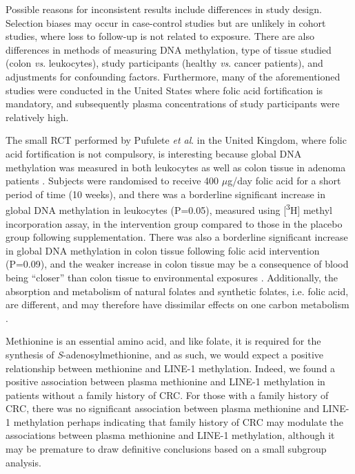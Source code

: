 \noindent Possible reasons for inconsistent results include differences in study design. Selection biases may occur in case-control studies but are unlikely in cohort studies, where loss to follow-up is not related to exposure. There are also differences in methods of measuring DNA methylation, type of tissue studied (colon \emph{vs}. leukocytes), study participants (healthy \emph{vs}. cancer patients), and adjustments for confounding factors. Furthermore, many of the aforementioned studies were conducted in the United States where folic acid fortification is mandatory, and subsequently plasma concentrations of study participants were relatively high.

\noindent The small RCT performed by Pufulete \emph{et al}. in the United Kingdom, where folic acid fortification is not compulsory, is interesting because global DNA methylation was measured in both leukocytes as well as colon tissue in adenoma patients \cite{c552}. Subjects were randomised to receive 400 $\mu$g/day folic acid for a short period of time (10 weeks), and there was a borderline significant increase in global DNA methylation in leukocytes (P=0.05), measured using [\textsuperscript{3}H] methyl incorporation assay, in the intervention group compared to those in the placebo group following supplementation. There was also a borderline significant increase in global DNA methylation in colon tissue following folic acid intervention (P=0.09), and the weaker increase in colon tissue may be a consequence of blood being ``closer'' than colon tissue to environmental exposures \cite{c553}. Additionally, the absorption and metabolism of natural folates and synthetic folates, i.e. folic acid, are different, and may therefore have dissimilar effects on one carbon metabolism \cite{c554,c555}.

\noindent Methionine is an essential amino acid, and like folate, it is required for the synthesis of \emph{S}-adenosylmethionine, and as such, we would expect a positive relationship between methionine and LINE-1 methylation. Indeed, we found a positive association between plasma methionine and LINE-1 methylation in patients without a family history of CRC. For those with a family history of CRC, there was no significant association between plasma methionine and LINE-1 methylation perhaps indicating that family history of CRC may modulate the associations between plasma methionine and LINE-1 methylation, although it may be premature to draw definitive conclusions based on a small subgroup analysis.

